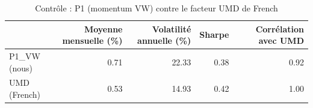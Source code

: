 \begin{table}[htbp]
\centering
\small
\caption{Contrôle : P1 (momentum VW) contre le facteur UMD de French}
\label{tab:T0_controle_P1}
\begin{tabular}{lrrrr}
\toprule
 & Moyenne mensuelle (\%) & Volatilité annuelle (\%) & Sharpe & Corrélation avec UMD \\
\midrule
P1\_VW (nous) & 0.71 & 22.33 & 0.38 & 0.92 \\
UMD (French) & 0.53 & 14.93 & 0.42 & 1.00 \\
\bottomrule
\end{tabular}
\end{table}